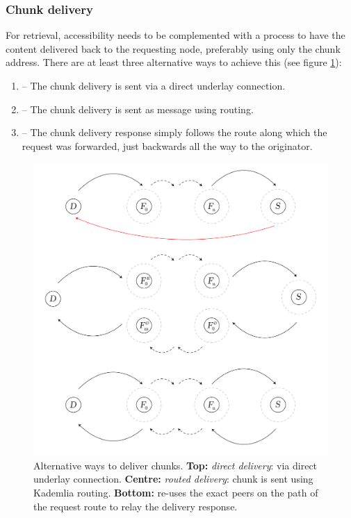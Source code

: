 \subsubsection{Chunk delivery}

For retrieval, accessibility needs to be complemented with a process to have the content delivered back to the requesting node, preferably using only the chunk address. There are at least three alternative ways to achieve this (see figure \ref{fig:chunk-delivery}):

\begin{enumerate}
    \item {} -- The chunk delivery is sent via a direct underlay connection. 
    \item {} -- The chunk delivery is sent as message using routing.
    \item {} -- The chunk delivery response simply follows the route along which the request was forwarded, just backwards all the way to the originator.
\end{enumerate}


\begin{figure}[htbp]
   \centering
   \includegraphics[width=\textwidth]{fig/chunk-delivery.pdf}
   \caption[Alternative ways to deliver chunks: direct, routed and backward \statusgreen]{Alternative ways to deliver chunks. \textbf{Top:} \emph{direct delivery}: via direct underlay connection. \textbf{Centre:} \emph{routed delivery}: chunk is sent using Kademlia routing. \textbf{Bottom:}  re-uses the exact peers on the path of the request route to relay the delivery response.}
   \label{fig:chunk-delivery}
\end{figure}

